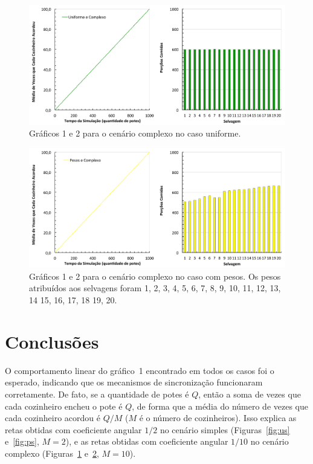 \documentclass[11pt,a4paper]{article}
\begin{document}
\begin{figure}[!ht]
  \begin{center} 
    \includegraphics[scale=0.5]{uniforme_complexo.pdf}
    \caption{Gráficos 1 e 2 para o cenário complexo no caso uniforme.}
    \label{fig:uc}
  \end{center}
\end{figure}
%
\begin{figure}[!ht]
  \begin{center} 
    \includegraphics[scale=0.5]{pesos_complexo.pdf}
    \caption{Gráficos 1 e 2 para o cenário complexo no caso com pesos. Os pesos atribuídos aos 
    selvagens foram 1, 2, 3, 4, 5, 6, 7, 8, 9, 10, 11, 12, 13, 14 15, 16, 17, 18 19, 20.}
    \label{fig:pc}
  \end{center}
\end{figure}


\section{Conclusões}
\label{sec:conc}

O comportamento linear do gráfico~1 encontrado em todos os casos foi o esperado, indicando que os 
mecanismos de sincronização funcionaram corretamente. De fato, se a quantidade de potes é $Q$, então 
a soma de vezes que cada cozinheiro encheu o pote é $Q$, de forma que a média do número de vezes que 
cada cozinheiro acordou é $Q/M$ ($M$ é o número de cozinheiros). Isso explica as retas obtidas com 
coeficiente angular $1/2$ no cenário simples (Figuras~\ref{fig:us} e~\ref{fig:ps}, $M = 2$), e as 
retas obtidas com coeficiente angular $1/10$ no cenário complexo (Figuras~\ref{fig:uc} 
e~\ref{fig:pc}, $M = 10$).
\end{document}
